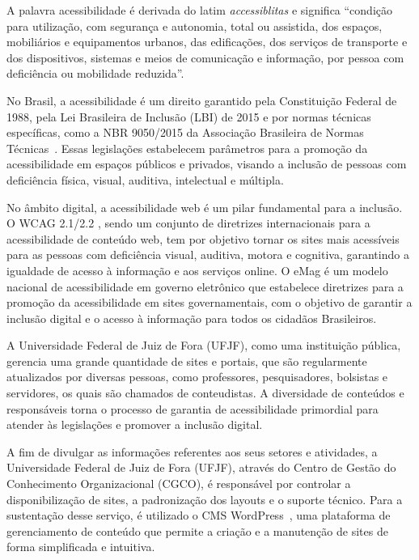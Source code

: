 \documentclass[
	article,			%
	12pt,				%
	oneside,			%
	a4paper,			%
	section=TITLE,		%
	subsection=TITLE,	%
	english,			%
	brazil,				%
	sumario=tradicional
	]{abntex2}
\begin{document}
A palavra acessibilidade é derivada do latim \textit{accessiblitas}
e significa ``condição para utilização, com segurança e autonomia,
total ou assistida, dos espaços, mobiliários e equipamentos urbanos, das
edificações, dos serviços de transporte e dos dispositivos, sistemas e meios de
comunicação e informação, por pessoa com deficiência ou mobilidade reduzida''\cite{CD}.

No Brasil, a acessibilidade é um direito garantido pela Constituição
Federal de 1988, pela Lei Brasileira de Inclusão (LBI) de 2015 \cite{LBI}
e por normas técnicas específicas, como a NBR 9050/2015 da Associação
Brasileira de Normas Técnicas~\cite{ABNT}. Essas legislações estabelecem
parâmetros para a promoção da acessibilidade em espaços públicos e privados,
visando a inclusão de pessoas com deficiência física, visual, auditiva,
intelectual e múltipla.

No âmbito digital, a acessibilidade web é um pilar fundamental para a
inclusão. O WCAG 2.1/2.2 \cite{wcag22}, sendo um conjunto de diretrizes
internacionais para a acessibilidade de conteúdo web, tem por objetivo 
tornar os sites mais acessíveis para as pessoas com deficiência visual, auditiva,
motora e cognitiva, garantindo a igualdade de acesso à informação e aos
serviços online. O eMag é um modelo nacional de acessibilidade em governo
eletrônico que estabelece diretrizes para a promoção da acessibilidade em
sites governamentais, com o objetivo de garantir a inclusão digital e o acesso
à informação para todos os cidadãos Brasileiros.

A Universidade Federal de Juiz de Fora (UFJF), como uma instituição pública,
gerencia uma grande quantidade de sites e portais, que são regularmente
atualizados por diversas pessoas, como professores, pesquisadores, bolsistas e
servidores, os quais são chamados de conteudistas. A diversidade de conteúdos e
responsáveis torna o processo de garantia de acessibilidade primordial para
atender às legislações e promover a inclusão digital.

A fim de divulgar as informações referentes aos seus setores e atividades, a
Universidade Federal de Juiz de Fora (UFJF), através do Centro de Gestão
do Conhecimento Organizacional (CGCO), é responsável por controlar a
disponibilização de sites, a padronização dos layouts e o suporte técnico. Para
a sustentação desse serviço, é utilizado o CMS WordPress~\cite{WP},
uma plataforma de gerenciamento de conteúdo que permite a criação e a 
manutenção de sites de forma simplificada e intuitiva.
\end{document}
